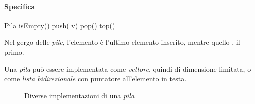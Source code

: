 \paragraph{Specifica}
\begin{code}{Pila}
     isEmpty()
    \nl{}
    push( v)
    \nl{}
     pop()
    \nl{}
     top()
\end{code}
\begin{note}
    Nel gergo delle \emph{pile}, l'elemento  è l'ultimo elemento
    inserito, mentre quello , il primo.
\end{note}\noindent
Una \emph{pila} può essere implementata come \emph{vettore}, quindi di dimensione
limitata, o come \emph{lista bidirezionale} con puntatore all'elemento in testa.
\begin{figure}[h]
    \centering
    \hspace*{2cm}
    \caption{Diverse implementazioni di una \emph{pila}}
\end{figure}

\newpage
